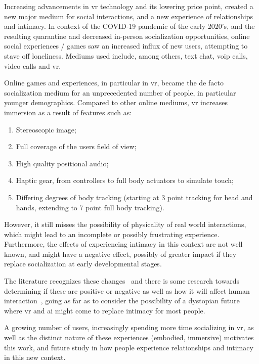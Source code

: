 
Increasing advancements in \gls{vr} technology and its lowering price point, created a new major medium for social interactions, and a new experience of relationships and intimacy.
In context of the COVID-19 pandemic of the early 2020's, and the resulting quarantine and decreased in-person socialization opportunities, online social experiences / games saw an increased influx of new users, attempting to stave off loneliness.
Mediums used include, among others, text chat, \gls{voip} calls, video calls and \gls{vr}. 

Online games and experiences, in particular in \gls{vr}, became the de facto socialization medium for an unprecedented number of people, in particular younger demographics.
Compared to other online mediums, \Gls{vr} increases immersion as a result of features such as:
\begin{enumerate}
	\item Stereoscopic image;
	\item Full coverage of the users field of view;
	\item High quality positional audio;
	\item Haptic gear, from controllers to full body actuators to simulate touch;
	\item Differing degrees of body tracking (starting at 3 point tracking for head and hands, extending to 7 point full body tracking).
\end{enumerate} 
However, it still misses the possibility of physicality of real world interactions, which might lead to an incomplete or possibly frustrating experience.
Furthermore, the effects of experiencing intimacy in this context are not well known, and might have a negative effect, possibly of greater impact if they replace socialization at early developmental stages.

The literature recognizes these changes~\cite{power2020new} and there is some research towards determining if these are positive or negative as well as how it will affect human interaction~\cite{essig2018technology,Kanwal2019}, going as far as to consider the possibility of a dystopian future where \gls{vr} and \gls{ai} might come to replace intimacy for most people.

A growing number of users, increasingly spending more time socializing in \gls{vr}, as well as the distinct nature of these experiences (\eg embodied, immersive) motivates this work, and future study in how people experience relationships and intimacy in this new context.

